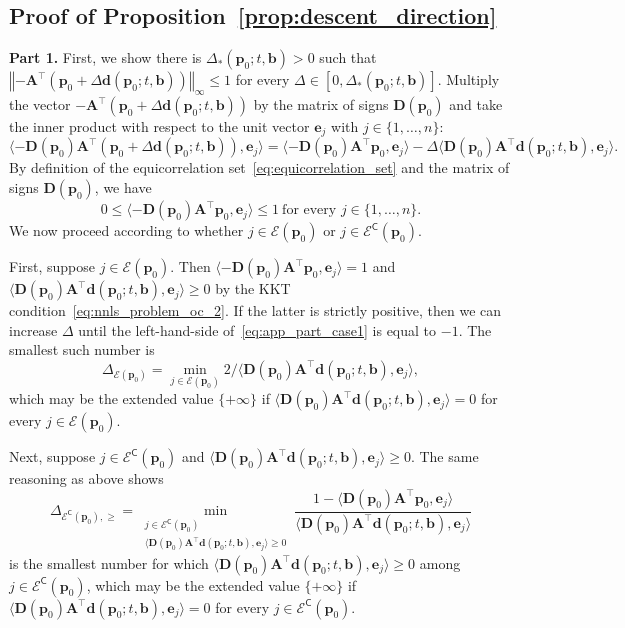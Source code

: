 \documentclass[11pt]{article}
\numberwithin{prop}{section}
\numberwithin{lem}{section}
\numberwithin{rem}{section}
\numberwithin{cor}{section}
\numberwithin{thm}{section}
\numberwithin{defn}{section}
\numberwithin{fact}{section}
\theoremstyle{plain}
\def\bb {\boldsymbol{b}}
\def\bd {\boldsymbol{d}}
\def\be {\boldsymbol{e}}
\def\bp {\boldsymbol{p}}
\newcommand{\norminf}[1]{\left\Vert{#1} \right\Vert_{\infty}}
\newcommand{\matr}[1]{\bm{#1}}
\def\bpo {\bp_{0}}
\def\epo {\mathcal{E}(\bp_{0})}
\def\ecpo {\mathcal{E}^{\mathsf{C}}(\bp_{0})}
\def\Atop {\matr{A}^{\top}}
\begin{document}
\subsection{Proof of Proposition~\ref{prop:descent_direction}}\label{app:proof_descent}
\textbf{Part 1.} First, we show there is $\Delta_{*}(\bpo;t,\bb) > 0$ such that $\norminf{-\Atop(\bpo + \Delta\bd(\bpo;t,\bb))} \leqslant 1$ for every $\Delta \in [0,\Delta_{*}(\bpo;t,\bb)]$. Multiply the vector $-\Atop(\bpo + \Delta\bd(\bpo;t,\bb))$ by the matrix of signs $\matr{D}(\bpo)$ and take the inner product with respect to the unit vector $\be_{j}$ with $j \in \{1,\dots,n\}$:
\begin{equation}\label{eq:app_part_case1}
\langle-\matr{D}(\bpo)\Atop(\bpo + \Delta\bd(\bpo;t,\bb)),\be_j\rangle = \langle -\matr{D}(\bpo)\Atop\bpo,\be_j\rangle - \Delta\langle \matr{D}(\bpo)\Atop\bd(\bpo;t,\bb),\be_j\rangle.
\end{equation}
By definition of the equicorrelation set~\eqref{eq:equicorrelation_set} and the matrix of signs $\matr{D}(\bpo)$, we have
\[
0 \leqslant \langle -\matr{D}(\bpo)\Atop\bpo,\be_j\rangle \leqslant 1 \ \text{for every $j \in \{1,\dots,n\}$.}
\]
We now proceed according to whether $j \in \epo$ or $j \in \ecpo$.


First, suppose $j \in \epo$. Then $\langle -\matr{D}(\bpo)\Atop\bpo,\be_j\rangle = 1$ and $\langle \matr{D}(\bpo)\Atop\bd(\bpo;t,\bb),\be_j\rangle \geqslant 0$ by the KKT condition~\eqref{eq:nnls_problem_oc_2}. If the latter is strictly positive, then we can increase $\Delta$ until the left-hand-side of~\eqref{eq:app_part_case1} is equal to $-1$. The smallest such number is
\[
\Delta_{\epo} = \min_{j \in \epo} 2/\langle \matr{D}(\bpo)\Atop\bd(\bpo;t,\bb),\be_j\rangle,
\]
which may be the extended value $\{+\infty\}$ if $\langle \matr{D}(\bpo)\Atop\bd(\bpo;t,\bb),\be_j\rangle = 0$ for every $j \in \epo$. 


Next, suppose $j \in \ecpo$ and $\langle \matr{D}(\bpo)\Atop\bd(\bpo;t,\bb),\be_j\rangle \geqslant 0$. The same reasoning as above shows
\[
\Delta_{\ecpo,\geqslant} = \min_{\substack{j \in \ecpo\\ \langle \matr{D}(\bpo)\Atop\bd(\bpo;t,\bb),\be_j\rangle \geqslant 0}} \frac{1 - \langle \matr{D}(\bpo)\Atop\bpo,\be_j\rangle}{\langle \matr{D}(\bpo)\Atop\bd(\bpo;t,\bb),\be_j\rangle}
\]
is the smallest number for which $\langle \matr{D}(\bpo)\Atop\bd(\bpo;t,\bb),\be_j\rangle \geqslant 0$ among $j \in \ecpo$, which may be the extended value $\{+\infty\}$ if $\langle \matr{D}(\bpo)\Atop\bd(\bpo;t,\bb),\be_j\rangle = 0$ for every $j \in \ecpo$. 
\end{document}
